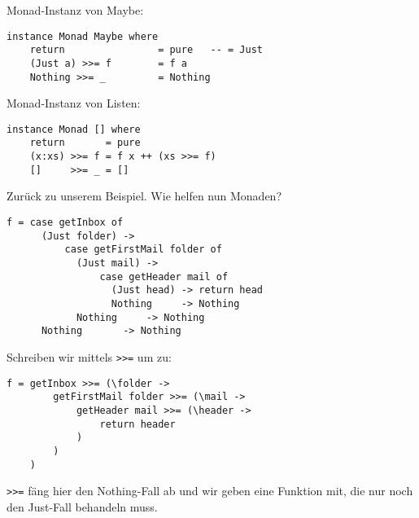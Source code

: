 \documentclass{beamer}
\begin{document}
\begin{frame}[fragile]
Monad-Instanz von Maybe:
\begin{verbatim}
instance Monad Maybe where
    return                = pure   -- = Just
    (Just a) >>= f        = f a
    Nothing >>= _         = Nothing
\end{verbatim}
\begin{comment}
\pause
Monad-Instanz von Either:
\begin{verbatim}
instance Monad Either where
    return                = pure   -- = Right
    (Right e) >>= f       = f e
    (Left e)  >>= _       = Left e
\end{verbatim}
\end{comment}
\pause
\bigskip

Monad-Instanz von Listen:
\begin{verbatim}
instance Monad [] where
    return       = pure
    (x:xs) >>= f = f x ++ (xs >>= f)
    []     >>= _ = []
\end{verbatim}
\end{frame}

\begin{frame}[fragile]
Zurück zu unserem Beispiel. Wie helfen nun Monaden?
\pause
\begin{verbatim}
f = case getInbox of
      (Just folder) -> 
          case getFirstMail folder of
            (Just mail) -> 
                case getHeader mail of
                  (Just head) -> return head
                  Nothing     -> Nothing
            Nothing     -> Nothing
      Nothing       -> Nothing
\end{verbatim}
\end{frame}

\begin{frame}[fragile]
Schreiben wir mittels \texttt{>>=} um zu:
\pause
\begin{verbatim}
f = getInbox >>= (\folder ->
        getFirstMail folder >>= (\mail ->
            getHeader mail >>= (\header ->
                return header
            )
        )
    )
\end{verbatim}
\pause
\texttt{>>=} fäng hier den Nothing-Fall ab und wir geben eine Funktion mit, die nur noch den Just-Fall behandeln muss.
\end{frame}
\end{document}
